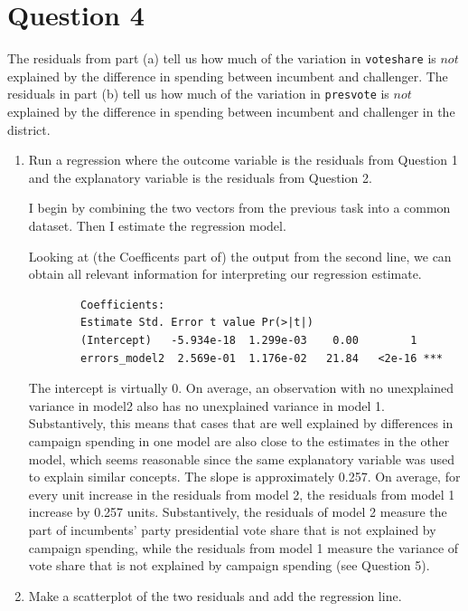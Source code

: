 \documentclass[12pt,letterpaper]{article}
\begin{document}
\newpage	
\section*{Question 4}
\noindent The residuals from part (a) tell us how much of the variation in \texttt{voteshare} is $not$ explained by the difference in spending between incumbent and challenger. The residuals in part (b) tell us how much of the variation in \texttt{presvote} is $not$ explained by the difference in spending between incumbent and challenger in the district.
	\begin{enumerate}
		\item Run a regression where the outcome variable is the residuals from Question 1 and the explanatory variable is the residuals from Question 2.	\vspace{0.5cm}
				
		I begin by combining the two vectors from the previous task into a common dataset. Then I estimate the regression model. 
		
		
		Looking at (the Coefficents part of) the output from the second line, we can obtain all relevant information for interpreting our regression estimate.
		
		\begin{verbatim}
		Coefficients:
		Estimate Std. Error t value Pr(>|t|)    
		(Intercept)   -5.934e-18  1.299e-03    0.00        1    
		errors_model2  2.569e-01  1.176e-02   21.84   <2e-16 ***		
		\end{verbatim}
		
		The intercept is virtually 0. On average, an observation with no unexplained variance in model2 also has no unexplained variance in model 1. Substantively, this means that cases that are well explained by differences in campaign spending in one model are also close to the estimates in the other model, which seems reasonable since the same explanatory variable was used to explain similar concepts.
		The slope is approximately 0.257. On average, for every unit increase in the residuals from model 2, the residuals from model 1 increase by 0.257 units. Substantively, the residuals of model 2 measure the part of incumbents' party presidential vote share that is not explained by campaign spending, while the residuals from model 1 measure the variance of vote share that is not explained by campaign spending (see Question 5).
		
		
		\item Make a scatterplot of the two residuals and add the regression line. 	
		

\end{enumerate}
\end{document}
